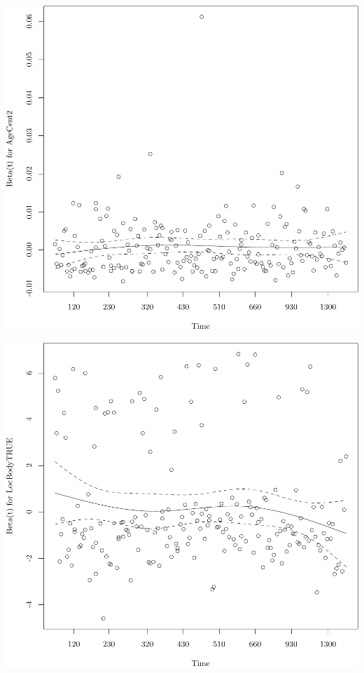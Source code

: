 \documentclass{article}\usepackage[]{graphicx}\usepackage[]{color}
\makeatletter
\def\maxwidth{ %
  \ifdim\Gin@nat@width>\linewidth
    \linewidth
  \else
    \Gin@nat@width
  \fi
}
\newenvironment{knitrout}{}{} %
\makeatother
\begin{document}
\begin{knitrout}
{\centering \includegraphics[width=\maxwidth]{figure/05-eda-ph-check-full-3-2} 

}




{\centering \includegraphics[width=\maxwidth]{figure/05-eda-ph-check-full-3-3} 

}





\end{knitrout}
\end{document}
